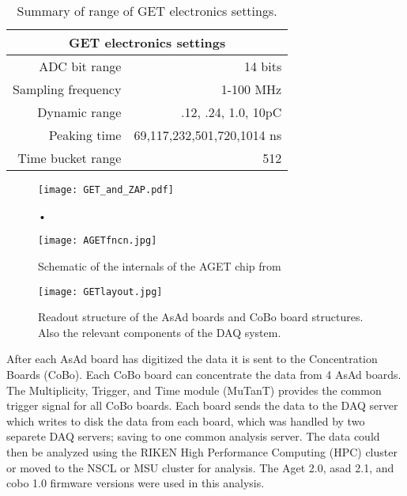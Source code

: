 \begin{table*}[!htb]
\centering
{}
\begin{tabular}{@{}rr@{}}\toprule 
\multicolumn{2}{c}{GET electronics settings}\\
\midrule
ADC bit range       & 14 bits \\
Sampling frequency  & 1-100 MHz \\
Dynamic range       & .12, .24, 1.0, 10pC \\
Peaking time        & 69,117,232,501,720,1014 ns \\
Time bucket range   & 512\\
\bottomrule
\end{tabular}
\caption{Summary of range of GET electronics settings. }
\label{tb:getoverview}
\end{table*}

\begin{figure}[!htb]
\centering
\texttt{[image: GET\_and\_ZAP.pdf]}
\caption{•}
\label{fig:getzap}
\end{figure}



\begin{figure}[!htb]
\centering
\texttt{[image: AGETfncn.jpg]}
\caption{Schematic of the internals of the AGET chip from \cite{get2}}
\label{fig:aget}
\end{figure}


\begin{figure}[!htb]
\centering
\texttt{[image: GETlayout.jpg]}
\caption{Readout structure of the AsAd boards and CoBo board structures. Also the relevant components of the DAQ system.}
\label{fig:coboDAQ}
\end{figure}

After each AsAd board has digitized the data it is sent to the Concentration Boards (CoBo). Each CoBo board can concentrate the data from 4 AsAd boards. The Multiplicity, Trigger, and Time module (MuTanT) \cite{get} provides the common trigger signal for all CoBo boards.  Each board sends the data to the DAQ server which writes to disk the data from each board, which was handled by two separete DAQ servers; saving to one common analysis server. The data could then be analyzed using the RIKEN High Performance Computing (HPC) cluster or moved to the NSCL or MSU cluster for analysis. The Aget 2.0, asad 2.1, and cobo 1.0 firmware versions were used in this analysis. 

